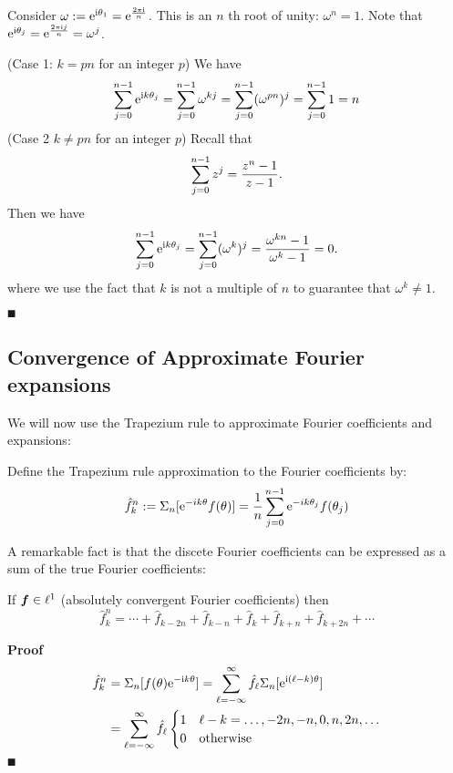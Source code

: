 Consider $\ensuremath{\omega} := {\rm e}^{{\rm i} \ensuremath{\theta}_1} = {\rm e}^{2 \ensuremath{\pi} {\rm i} \over n}$. This is an $n$ th root of unity: $\ensuremath{\omega}^n = 1$. Note that ${\rm e}^{{\rm i} \ensuremath{\theta}_j} ={\rm e}^{2 \ensuremath{\pi} {\rm i} j \over n}= \ensuremath{\omega}^j$.

(Case 1: $k = pn$ for an integer $p$) We have
\[
\ensuremath{\sum}_{j=0}^{n-1} {\rm e}^{{\rm i} k \ensuremath{\theta}_j} = \ensuremath{\sum}_{j=0}^{n-1} \ensuremath{\omega}^{kj} = \ensuremath{\sum}_{j=0}^{n-1} ({\ensuremath{\omega}^{pn}})^j =   \ensuremath{\sum}_{j=0}^{n-1} 1 = n
\]
(Case 2 $k \ensuremath{\neq} pn$ for an integer $p$)  Recall that
\[
\ensuremath{\sum}_{j=0}^{n-1} z^j = {z^n-1 \over z-1}.
\]
Then we have
\[
\ensuremath{\sum}_{j=0}^{n-1} {\rm e}^{{\rm i} k \ensuremath{\theta}_j} = \ensuremath{\sum}_{j=0}^{n-1} (\ensuremath{\omega}^k)^j = {\ensuremath{\omega}^{kn} -1 \over \ensuremath{\omega}^k -1} = 0.
\]
where we use the fact that $k$ is not a multiple of $n$ to guarantee that $\ensuremath{\omega}^k \ensuremath{\neq} 1$.

\ensuremath{\QED}

\subsection{Convergence of Approximate Fourier expansions}
We will now use the Trapezium rule to approximate Fourier coefficients and expansions:

\begin{definition} Define the Trapezium rule approximation to the Fourier coefficients by:
\[
\hat f_k^n := \ensuremath{\Sigma}_n[{\rm e}^{-i k \ensuremath{\theta}} f(\ensuremath{\theta})]  = {1 \over n} \ensuremath{\sum}_{j=0}^{n-1} {\rm e}^{-i k \ensuremath{\theta}_j} f(\ensuremath{\theta}_j)
\]
\end{definition}

A remarkable fact is that the discete Fourier coefficients can be expressed as a sum of the true Fourier coefficients:

\begin{theorem} If ${\mbox{\boldmath$f$\unboldmath}} \in \ell^1$ (absolutely convergent Fourier coefficients) then
\[
\hat f_k^n = \ensuremath{\cdots} + \hat f_{k-2n} + \hat f_{k-n} + \hat f_k + \hat f_{k+n} + \hat f_{k+2n} + \ensuremath{\cdots}
\]
\end{theorem}
\textbf{Proof}
\begin{align*}
\hat f_k^n &= \ensuremath{\Sigma}_n[f(\ensuremath{\theta}) {\rm e}^{-{\rm i} k \ensuremath{\theta}}] = \ensuremath{\sum}_{\ensuremath{\ell}=-\ensuremath{\infty}}^\ensuremath{\infty} \hat f_\ensuremath{\ell} \ensuremath{\Sigma}_n[{\rm e}^{{\rm i} (\ensuremath{\ell}-k) \ensuremath{\theta}}] \\
&= \ensuremath{\sum}_{\ensuremath{\ell}=-\ensuremath{\infty}}^\ensuremath{\infty} \hat f_\ensuremath{\ell} \begin{cases} 1 & \ensuremath{\ell}-k = \ldots,-2n,-n,0,n,2n,\ldots  \cr
0 & \hbox{otherwise}
\end{cases}
\end{align*}
\ensuremath{\QED}

